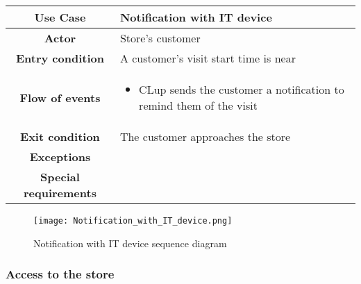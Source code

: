 \documentclass[../../main.tex]{subfiles}
\begin{document}
      \begin{table}[H]
        \centering
          \begin{tabular}{c m{}}
          \hline
          \textbf{Use Case} & Notification with IT device \\ \hline
          \textbf{Actor} & Store's customer\\ \hline
          \textbf{Entry condition} & A customer's visit start time is near\\  \hline
          \textbf{Flow of events} & \begin{itemize}
                                      \item CLup sends the customer a notification to remind them of the visit
                                    \end{itemize}\\ \hline
          \textbf{Exit condition} & The customer approaches the store \\ \hline
          \textbf{Exceptions} & \\ \hline
          \textbf{Special requirements} &\\ \hline
          \end{tabular}
      \end{table}

      \begin{figure}[H]
        \centering
        \texttt{[image: Notification\_with\_IT\_device.png]}
        \caption{Notification with IT device sequence diagram}
      \end{figure}


      \subsubsection{Access to the store}
\end{document}
